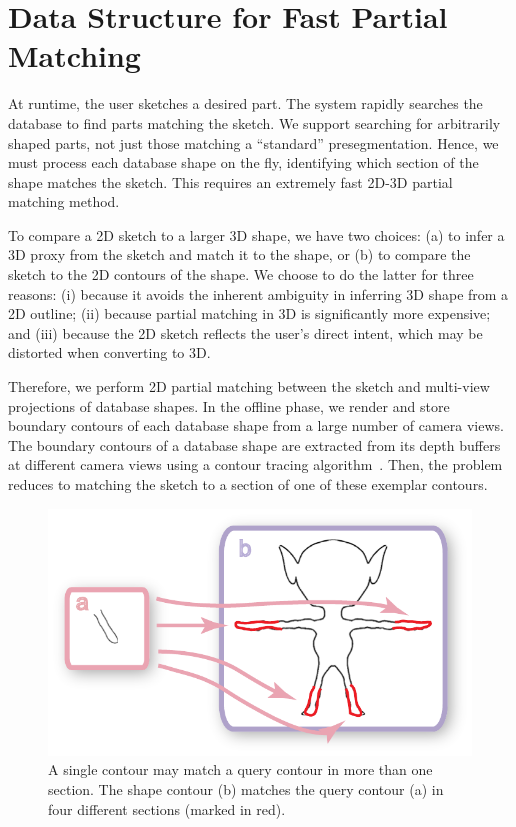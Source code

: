 \section{Data Structure for Fast Partial Matching}\label{sec:acc}

At runtime, the user sketches a desired part. The system rapidly searches the database to find parts matching the sketch. We support searching for arbitrarily shaped parts, not just those matching a ``standard'' presegmentation. Hence, we must process each database shape on the fly, identifying which section of the shape matches the sketch. This requires an extremely fast 2D-3D partial matching method.

To compare a 2D sketch to a larger 3D shape, we have two choices: (a) to infer a 3D proxy from the sketch \cite{Igarashi:1999:TSI:311535.311602} and match it to the shape, or (b) to compare the sketch to the 2D contours of the shape. We choose to do the latter for three reasons: (i) because it avoids the inherent ambiguity in inferring 3D shape from a 2D outline; (ii) because partial matching in 3D is significantly more expensive; and (iii) because the 2D sketch reflects the user's direct intent, which may be distorted when converting to 3D.

Therefore, we perform 2D partial matching between the sketch and multi-view projections of database shapes. In the offline phase, we render and store boundary contours of each database shape from a large number of camera views. The boundary contours of a database shape are extracted from its depth buffers at different camera views using a contour tracing algorithm~\cite{onvisualsimilaritychencgf2003}.
Then, the problem reduces to matching the sketch to a section of one of these exemplar contours.

\begin{figure}[t]\centering
\includegraphics[width=0.85\linewidth]{./Material/CtourMatch.pdf}
\caption{A single contour may match a query contour in more than one section. The shape contour (b) matches the query contour (a) in four different sections (marked in red).}\label{fig:CtourMatch}
\end{figure}

